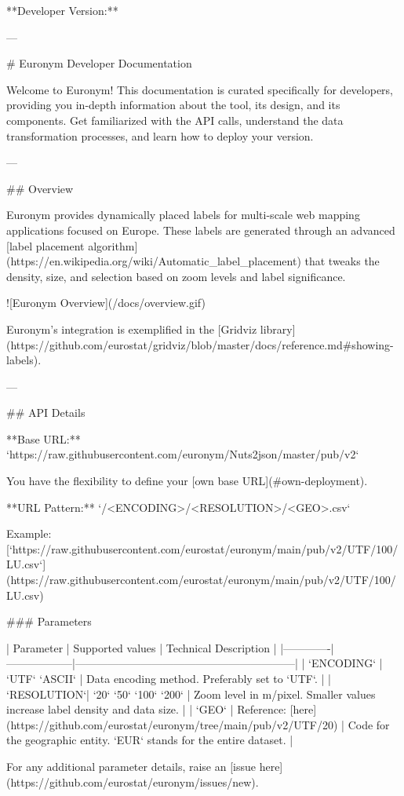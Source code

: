 **Developer Version:**

---

# Euronym Developer Documentation

Welcome to Euronym! This documentation is curated specifically for developers, providing you in-depth information about the tool, its design, and its components. Get familiarized with the API calls, understand the data transformation processes, and learn how to deploy your version.

---

## Overview

Euronym provides dynamically placed labels for multi-scale web mapping applications focused on Europe. These labels are generated through an advanced [label placement algorithm](https://en.wikipedia.org/wiki/Automatic_label_placement) that tweaks the density, size, and selection based on zoom levels and label significance.

![Euronym Overview](/docs/overview.gif)

Euronym's integration is exemplified in the [Gridviz library](https://github.com/eurostat/gridviz/blob/master/docs/reference.md#showing-labels). 

---

## API Details

**Base URL:** 
`https://raw.githubusercontent.com/euronym/Nuts2json/master/pub/v2`

You have the flexibility to define your [own base URL](#own-deployment). 

**URL Pattern:**
`/<ENCODING>/<RESOLUTION>/<GEO>.csv`

Example:
[`https://raw.githubusercontent.com/eurostat/euronym/main/pub/v2/UTF/100/LU.csv`](https://raw.githubusercontent.com/eurostat/euronym/main/pub/v2/UTF/100/LU.csv)

### Parameters

| Parameter   | Supported values | Technical Description                                     |
|-------------|------------------|------------------------------------------------------------|
| `ENCODING`  | `UTF` `ASCII`    | Data encoding method. Preferably set to `UTF`.             |
| `RESOLUTION`| `20` `50` `100` `200` | Zoom level in m/pixel. Smaller values increase label density and data size. |
| `GEO`       | Reference: [here](https://github.com/eurostat/euronym/tree/main/pub/v2/UTF/20) | Code for the geographic entity. `EUR` stands for the entire dataset. |

For any additional parameter details, raise an [issue here](https://github.com/eurostat/euronym/issues/new).

